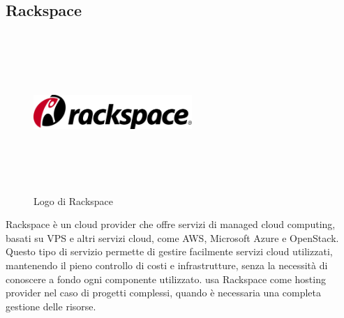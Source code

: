    \subsection{Rackspace}
   \begin{figure}[htbp]
      \begin{center}
         \includegraphics[width=6cm,height=6cm,keepaspectratio]{immagini/rackspace-logo}
      \end{center}
      \caption{Logo di Rackspace}
   \end{figure}
   Rackspace è un cloud provider che offre servizi di managed cloud computing, basati su VPS e altri servizi cloud, come AWS, Microsoft Azure e OpenStack. Questo tipo di servizio permette di gestire facilmente servizi cloud utilizzati, mantenendo il pieno controllo di costi e infrastrutture, senza la necessità di conoscere a fondo ogni componente utilizzato.
   \nomeAzienda{} usa Rackspace come hosting provider nel caso di progetti complessi, quando è necessaria una completa gestione delle risorse.

